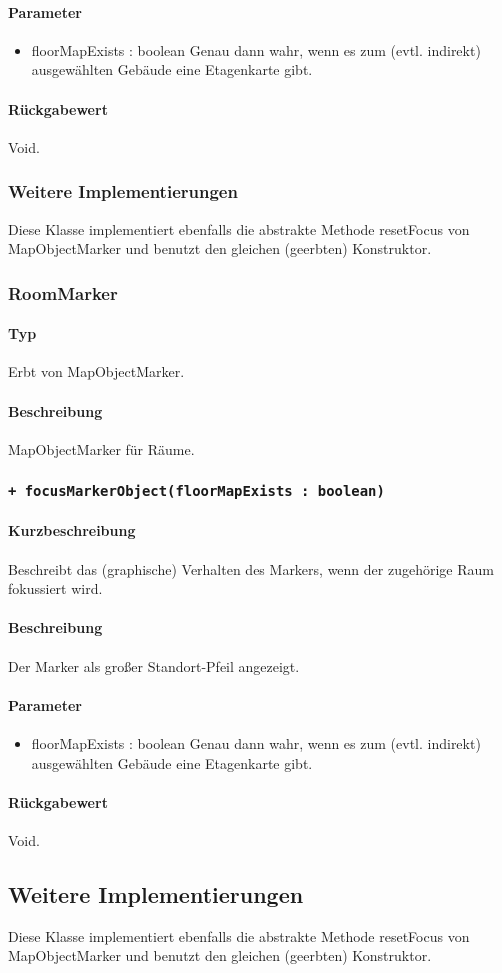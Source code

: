 \paragraph*{Parameter}
\begin{itemize}
    \item floorMapExists : boolean Genau dann wahr, wenn es zum (evtl. indirekt) ausgewählten Gebäude eine Etagenkarte gibt.
\end{itemize}
\paragraph*{Rückgabewert}
Void.

\subsubsection*{Weitere Implementierungen}
Diese Klasse implementiert ebenfalls die abstrakte Methode resetFocus von MapObjectMarker 
und benutzt den gleichen (geerbten) Konstruktor.

\subsubsection{RoomMarker}
\paragraph*{Typ} 
Erbt von MapObjectMarker.
\paragraph*{Beschreibung}
MapObjectMarker für Räume.

\subsubsection*{\texttt{+ focusMarkerObject(floorMapExists : boolean)}}%
\paragraph*{Kurzbeschreibung}
Beschreibt das (graphische) Verhalten des Markers, wenn der zugehörige Raum fokussiert wird.
\paragraph*{Beschreibung}
Der Marker als großer Standort-Pfeil angezeigt.
\paragraph*{Parameter}
\begin{itemize}
    \item floorMapExists : boolean Genau dann wahr, wenn es zum (evtl. indirekt) ausgewählten Gebäude eine Etagenkarte gibt.
\end{itemize}
\paragraph*{Rückgabewert}
Void.

\subsection*{Weitere Implementierungen}
Diese Klasse implementiert ebenfalls die abstrakte Methode resetFocus von MapObjectMarker 
und benutzt den gleichen (geerbten) Konstruktor.
